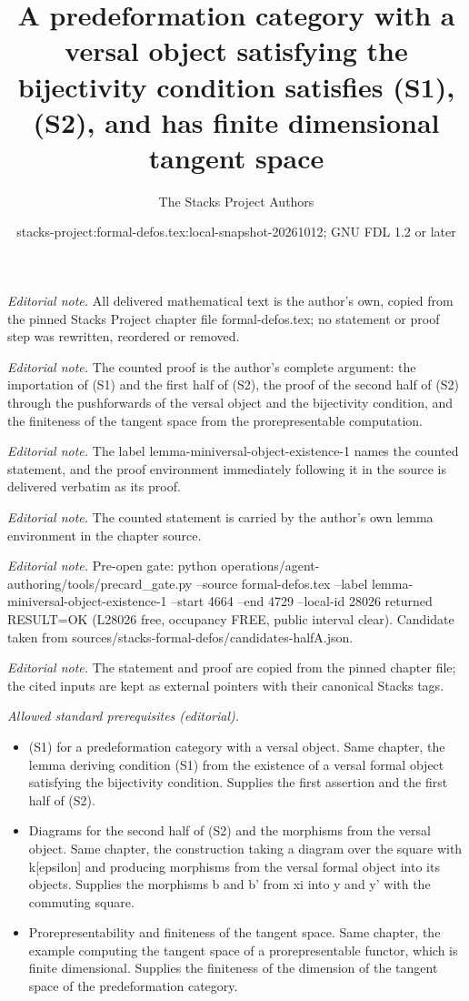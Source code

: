 \documentclass[10pt,a4paper]{amsart}
\title{A predeformation category with a versal object satisfying the bijectivity condition satisfies (S1), (S2), and has finite dimensional tangent space}
\author{The Stacks Project Authors}
\date{stacks-project:formal-defos.tex:local-snapshot-20261012; GNU FDL 1.2 or later}
\theoremstyle{plain}
\theoremstyle{definition}
\theoremstyle{remark}
\numberwithin{equation}{subsection}
\begin{document}
\maketitle
\noindent\textit{Editorial note.} All delivered mathematical text is the author's own, copied from the pinned Stacks Project chapter file formal-defos.tex; no statement or proof step was rewritten, reordered or removed.\par\medskip
\noindent\textit{Editorial note.} The counted proof is the author's complete argument: the importation of (S1) and the first half of (S2), the proof of the second half of (S2) through the pushforwards of the versal object and the bijectivity condition, and the finiteness of the tangent space from the prorepresentable computation.\par\medskip
\noindent\textit{Editorial note.} The label lemma-miniversal-object-existence-1 names the counted statement, and the proof environment immediately following it in the source is delivered verbatim as its proof.\par\medskip
\noindent\textit{Editorial note.} The counted statement is carried by the author's own lemma environment in the chapter source.\par\medskip
\noindent\textit{Editorial note.} Pre-open gate: python operations/agent-authoring/tools/precard\_gate.py --source formal-defos.tex --label lemma-miniversal-object-existence-1 --start 4664 --end 4729 --local-id 28026 returned RESULT=OK (L28026 free, occupancy FREE, public interval clear). Candidate taken from sources/stacks-formal-defos/candidates-halfA.json.\par\medskip
\noindent\textit{Editorial note.} The statement and proof are copied from the pinned chapter file; the cited inputs are kept as external pointers with their canonical Stacks tags.\par\medskip
\noindent\textit{Allowed standard prerequisites (editorial).}\begin{itemize}
\item (S1) for a predeformation category with a versal object. Same chapter, the lemma deriving condition (S1) from the existence of a versal formal object satisfying the bijectivity condition. Supplies the first assertion and the first half of (S2).
\item Diagrams for the second half of (S2) and the morphisms from the versal object. Same chapter, the construction taking a diagram over the square with k[epsilon] and producing morphisms from the versal formal object into its objects. Supplies the morphisms b and b' from xi into y and y' with the commuting square.
\item Prorepresentability and finiteness of the tangent space. Same chapter, the example computing the tangent space of a prorepresentable functor, which is finite dimensional. Supplies the finiteness of the dimension of the tangent space of the predeformation category.
\end{itemize}\medskip
\end{document}
